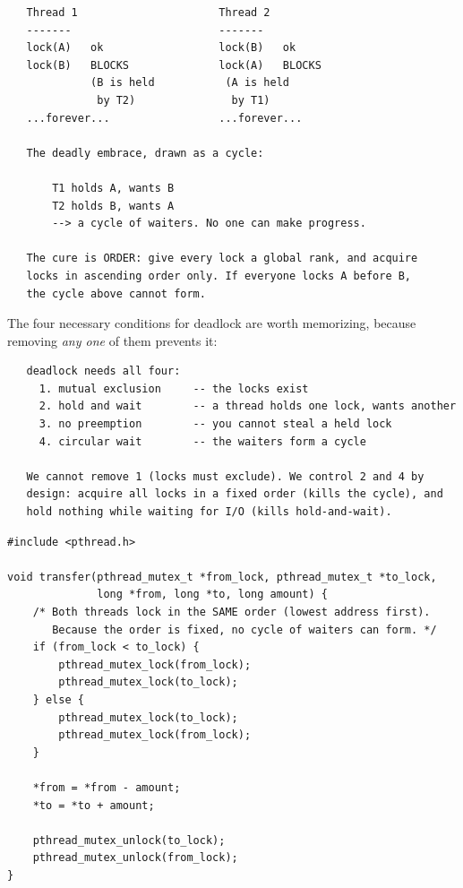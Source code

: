 \begin{verbatim}
   Thread 1                      Thread 2
   -------                       -------
   lock(A)   ok                  lock(B)   ok
   lock(B)   BLOCKS              lock(A)   BLOCKS
             (B is held           (A is held
              by T2)               by T1)
   ...forever...                 ...forever...

   The deadly embrace, drawn as a cycle:

       T1 holds A, wants B
       T2 holds B, wants A
       --> a cycle of waiters. No one can make progress.

   The cure is ORDER: give every lock a global rank, and acquire
   locks in ascending order only. If everyone locks A before B,
   the cycle above cannot form.
\end{verbatim}

The four necessary conditions for deadlock are worth memorizing,
because removing \emph{any one} of them prevents it:

\begin{verbatim}
   deadlock needs all four:
     1. mutual exclusion     -- the locks exist
     2. hold and wait        -- a thread holds one lock, wants another
     3. no preemption        -- you cannot steal a held lock
     4. circular wait        -- the waiters form a cycle

   We cannot remove 1 (locks must exclude). We control 2 and 4 by
   design: acquire all locks in a fixed order (kills the cycle), and
   hold nothing while waiting for I/O (kills hold-and-wait).
\end{verbatim}

\begin{lstlisting}[caption={The deadlock-free pattern: lock in one order, always.}]
#include <pthread.h>

void transfer(pthread_mutex_t *from_lock, pthread_mutex_t *to_lock,
              long *from, long *to, long amount) {
    /* Both threads lock in the SAME order (lowest address first).
       Because the order is fixed, no cycle of waiters can form. */
    if (from_lock < to_lock) {
        pthread_mutex_lock(from_lock);
        pthread_mutex_lock(to_lock);
    } else {
        pthread_mutex_lock(to_lock);
        pthread_mutex_lock(from_lock);
    }

    *from = *from - amount;
    *to = *to + amount;

    pthread_mutex_unlock(to_lock);
    pthread_mutex_unlock(from_lock);
}
\end{lstlisting}

